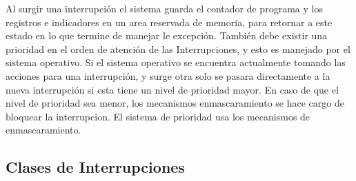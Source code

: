 \documentclass{article}
\begin{document}
	Al surgir una interrupción el sistema guarda el contador de programa y los registros e indicadores en un area reservada de memoria, para retornar a este estado en lo que termine de manejar le excepción. También debe existir una prioridad en el orden de atención de las Interrupciones, y esto es manejado por el sistema operativo. Si el sistema operativo se encuentra actualmente tomando las acciones para una interrupción, y surge otra solo se pasara directamente a la nueva interrupción si esta tiene un nivel de prioridad mayor. En caso de que el nivel de prioridad sea menor, los mecanismos enmascaramiento se hace cargo de bloquear la interrupcion. El sistema de prioridad usa los mecanismos de enmascaramiento.
	
	\vspace{0.2cm}
	\begin{centering} \section{Clases de Interrupciones} \end{centering}
\end{document}
